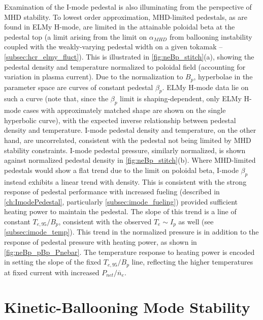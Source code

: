 Examination of the I-mode pedestal is also illuminating from the perspective of MHD stability.  To lowest order approximation, MHD-limited pedestals, as are found in ELMy H-mode, are limited in the attainable poloidal beta at the pedestal top (a limit arising from the limit on $\alpha_{MHD}$ from ballooning instability coupled with the weakly-varying pedestal width on a given tokamak -- \cf \cref{subsec:hcr_elmy_fluct}).  This is illustrated in \cref{fig:neBp_stitch}(a), showing the pedestal density and temperature normalized to poloidal field (accounting for variation in plasma current).  Due to the normalization to $B_p$, hyperbolae in the parameter space are curves of constant pedestal $\beta_{p}$.  ELMy H-mode data lie on such a curve (note that, since the $\beta_p$ limit is shaping-dependent, only ELMy H-mode cases with approximately matched shape are shown on the single hyperbolic curve), with the expected inverse relationship between pedestal density and temperature.  I-mode pedestal density and temperature, on the other hand, are uncorrelated, consistent with the pedestal not being limited by MHD stability constraints.  I-mode pedestal pressure, similarly normalized, is shown against normalized pedestal density in \cref{fig:neBp_stitch}(b).  Where MHD-limited pedestals would show a flat trend due to the limit on poloidal beta, I-mode $\beta_p$ instead exhibits a linear trend with density.  This is consistent with the strong response of pedestal performance with increased fueling (described in \cref{ch:ImodePedestal}, particularly \cref{subsec:imode_fueling}) provided sufficient heating power to maintain the pedestal.  The slope of this trend is a line of constant $T_{e,95}/B_p$, consistent with the observed $T_e \sim I_p$ as well (see \cref{subsec:imode_temp}).  This trend in the normalized pressure is in addition to the response of pedestal pressure with heating power, as shown in \cref{fig:neBp_pBp_Pnebar}.  The temperature response to heating power is encoded in setting the slope of the fixed $T_{e,95}/B_p$ line, reflecting the higher temperatures at fixed current with increased $P_{net}/\overline{n}_e$.\nicesectionending

\section{Kinetic-Ballooning Mode Stability}\label{sec:imode_baloo}

